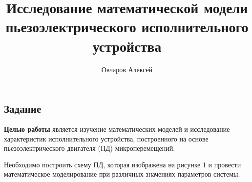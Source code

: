 \documentclass[a4paper, 12pt]{article}
\author{Овчаров Алексей}
\title{Исследование математической модели пьезоэлектрического исполнительного устройства}
\begin{document}
\maketitle

\begin{center}
\section{Задание}
\end{center} \par
\textbf{Целью работы} является изучение математических моделей и исследование характеристик исполнительного устройства, построенного на основе пьезоэлектрического двигателя (ПД) микроперемещений. \par
Необходимо построить схему ПД, которая изображена на рисунке 1 и провести математическое моделирование при различных значениях параметров системы.
\end{document}
